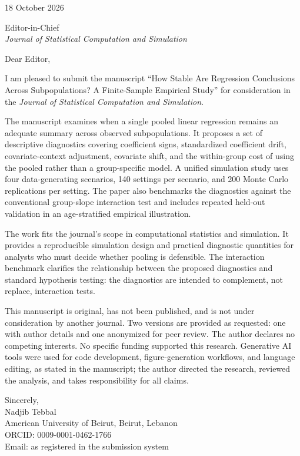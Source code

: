 \documentclass[11pt]{article}
\begin{document}
\begin{flushright}
18 October 2026
\end{flushright}

Editor-in-Chief\\
\emph{Journal of Statistical Computation and Simulation}

\vspace{1em}

Dear Editor,

I am pleased to submit the manuscript ``How Stable Are Regression Conclusions Across Subpopulations? A Finite-Sample Empirical Study'' for consideration in the \emph{Journal of Statistical Computation and Simulation}.

The manuscript examines when a single pooled linear regression remains an adequate summary across observed subpopulations. It proposes a set of descriptive diagnostics covering coefficient signs, standardized coefficient drift, covariate-context adjustment, covariate shift, and the within-group cost of using the pooled rather than a group-specific model. A unified simulation study uses four data-generating scenarios, 140 settings per scenario, and 200 Monte Carlo replications per setting. The paper also benchmarks the diagnostics against the conventional group-slope interaction test and includes repeated held-out validation in an age-stratified empirical illustration.

The work fits the journal's scope in computational statistics and simulation. It provides a reproducible simulation design and practical diagnostic quantities for analysts who must decide whether pooling is defensible. The interaction benchmark clarifies the relationship between the proposed diagnostics and standard hypothesis testing: the diagnostics are intended to complement, not replace, interaction tests.

This manuscript is original, has not been published, and is not under consideration by another journal. Two versions are provided as requested: one with author details and one anonymized for peer review. The author declares no competing interests. No specific funding supported this research. Generative AI tools were used for code development, figure-generation workflows, and language editing, as stated in the manuscript; the author directed the research, reviewed the analysis, and takes responsibility for all claims.

\begin{flushright}
Sincerely,\\[0.5em]
Nadjib Tebbal\\
American University of Beirut, Beirut, Lebanon\\
ORCID: 0009-0001-0462-1766\\
Email: as registered in the submission system
\end{flushright}
\end{document}
